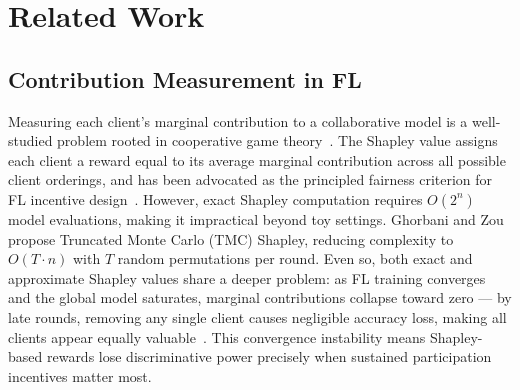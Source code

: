 \documentclass[journal]{IEEEtran}
\theoremstyle{definition}
\theoremstyle{remark}
\begin{document}

\section{Related Work}
\label{sec:related}

\subsection{Contribution Measurement in FL}

Measuring each client's marginal contribution to a collaborative
model is a well-studied problem rooted in cooperative game
theory~\cite{shapley1953value}.
The Shapley value assigns each client a reward equal to its average
marginal contribution across all possible client orderings, and has
been advocated as the principled fairness criterion for FL
incentive design~\cite{song2019profit, wang2020measure}.
However, exact Shapley computation requires $O(2^n)$ model
evaluations, making it impractical beyond toy settings.
Ghorbani and Zou~\cite{ghorbani2019data} propose Truncated Monte
Carlo (TMC) Shapley, reducing complexity to $O(T \cdot n)$ with $T$
random permutations per round.
Even so, both exact and approximate Shapley values share a deeper
problem: as FL training converges and the global model saturates,
marginal contributions collapse toward zero --- by late rounds,
removing any single client causes negligible accuracy loss,
making all clients appear equally
valuable~\cite{poshapley2023}.
This convergence instability means Shapley-based rewards
lose discriminative power precisely when sustained participation
incentives matter most.
\end{document}
